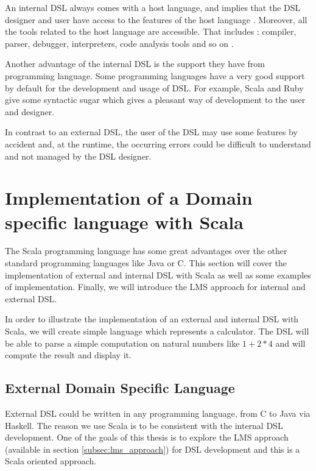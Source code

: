 An internal \gls{DSL} always comes with a host language, and implies that the
\gls{DSL} designer and user have access to the features of the host language
\cite{strembeckmarkzdunuwe2009}. Moreover, all the tools related to the host
language are accessible. That includes : compiler, parser, debugger,
interpreters, code analysis tools and so on \cite{strembeckmarkzdunuwe2009}.

Another advantage of the internal \gls{DSL} is the support they have from
programming language. Some programming languages have a very good support by
default for the development and usage of \gls{DSL}. For example, Scala and Ruby
give some syntactic sugar which gives a pleasant way of development to the
user and designer.

In contrast to an external \gls{DSL}, the user of the \gls{DSL} may use some
features by accident and, at the runtime, the occurring errors could be
difficult to understand and not managed by the \gls{DSL} designer.

\section{Implementation of a Domain specific language with Scala}
\label{sec:implementation_of_a_dsl}

The Scala programming language has some great advantages over the other standard
programming languages like Java or C. This section will cover the implementation
of external and internal \gls{DSL} with Scala as well as some examples of
implementation. Finally, we will introduce the \gls{LMS} approach for internal
and external \gls{DSL}.

In order to illustrate the implementation of an external and internal \gls{DSL}
with Scala, we will create simple language which represents a calculator. The
\gls{DSL} will be able to parse a simple computation on natural numbers like $1 +
2 * 4$ and will compute the result and display it.

\subsection{External Domain Specific Language}
\label{subsec:scala_external_dsl}

External \gls{DSL} could be written in any programming language, from C to Java
via Haskell. The reason we use Scala is to be consistent with the internal
\gls{DSL} development. One of the goals of this thesis is to explore the
\gls{LMS} approach (available in section \ref{subsec:lms_approach}) for
\gls{DSL} development and this is a Scala oriented approach.

